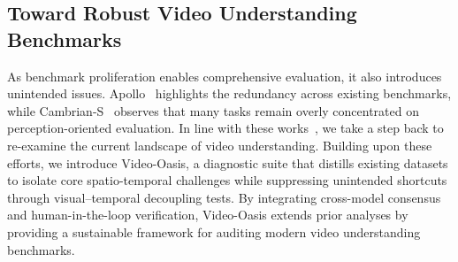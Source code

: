 \documentclass[runningheads]{llncs}
\begin{document}
{    \subsection{Toward Robust Video Understanding Benchmarks}
        As benchmark proliferation enables comprehensive evaluation, it also introduces unintended issues. 
        Apollo~\cite{apollo} highlights the redundancy across existing benchmarks, while Cambrian-S~\cite{cambrian} observes that many tasks remain overly concentrated on perception-oriented evaluation.
        In line with these works~\cite{apollo,egotempo,cambrian}, we take a step back to re-examine the current landscape of video understanding.
        Building upon these efforts, we introduce Video-Oasis, a diagnostic suite that distills existing datasets to isolate core spatio-temporal challenges while suppressing unintended shortcuts through visual–temporal decoupling tests.
        By integrating cross-model consensus and human-in-the-loop verification, Video-Oasis extends prior analyses by providing a sustainable framework for auditing modern video understanding benchmarks.
}
\end{document}
